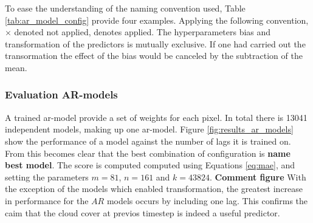 To ease the understanding of the naming convention used, Table \ref{tab:ar_model_config} provide four examples. Applying the following convention, $\times$ denoted not applied, \checked denotes applied.
The hyperparameters bias and transformation of the predictors is mutually exclusive. If one had carried out the transormation the effect of the bias would be canceled by the subtraction of the mean. 
\begin{table}[h]
    \centering
    \caption{Example configuration of \acrshort{ar}-models. $\times$ denoted not applied, \checked denotes applied.}
    \label{tab:ar_model_config}
\end{table}

\subsubsection{Evaluation AR-models}
A trained \acrshort{ar}-model provide a set of weights for each pixel. In total there is 13041 independent models, making up one \acrshort{ar}-model. Figure \ref{fig:results_ar_models} show the performance of a model against the number of lags it is trained on. From this becomes clear that the best combination of configuration is \textbf{name best model}. The score is computed computed using Equations \eqref{eq:mae}, and setting the parameters $m = 81$, $n=161$ and $k=43824$. 
\textbf{Comment figure}
With the exception of the models which enabled transformation, the greatest increase in performance for the $AR$ models occurs by including one lag. This confirms the caim that the cloud cover at previos timestep is indeed a useful predictor. 

